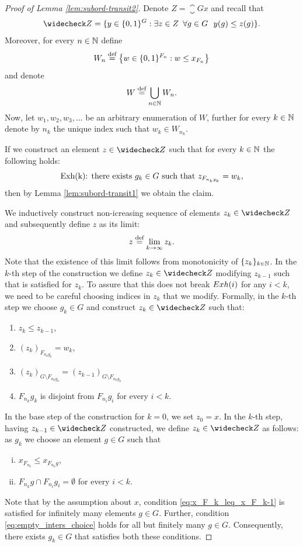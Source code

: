 \begin{proof}[Proof of Lemma \ref{lem:subord-transit2}]
Denote $Z= \closure{Gx}$ and recall that
\[
\subord{Z} = \{y\in\{0,1\}^G:\exists z\in Z \,\,\,\forall g\in G \,\,\,\, y(g)\leq z(g) \}.
\]
Moreover, for every $n\in\mathbb{N}$ define
\[
W_n\stackrel{\textup{def}}{=} \left\{w\in\{0,1\}^{F_n}: w\leq x_{F_n}\right\}
\] 
and denote 
\[
W\stackrel{\textup{def}}{=} \bigcup_{n\in\mathbb{N}} W_n.
\]
Now, let $w_1,w_2,w_3,\ldots$ be an arbitrary enumeration of $W$, further for every $k\in\mathbb{N}$ denote by $n_k$ the unique index such that $w_k\in W_{n_k}$. 

If we construct an element $z\in\subord Z$ such that for every $k\in\mathbb{N}$ the following holds:
\[
\mbox{Exh({k}):  there exists $g_k\in G$ such that $z_{F_{n_kg_k}} = w_k$},
\]
then by Lemma \ref{lem:subord-transit1} we obtain the claim.

We inductively construct non-icreasing sequence of elements $z_k\in\subord{Z}$ and subsequently define $z$ as its limit:
\[
z\stackrel{\textup{def}}{=}\lim_{k\to\infty} z_k. 
\]
Note that the existence of this limit follows from monotonicity of $\{z_k\}_{k\in\mathbb{N}}$.
In the $k$-th step of the construction we define $z_k\in\subord{Z}$ modifying $z_{k-1}$ such that  is satisfied for $z_k$. To assure that this does not break $Exh({i})$ for any $i<k$, we need to be careful choosing indices in $z_k$ that we modify. Formally, in the $k$-th step we choose $g_k\in G$ and construct $z_k\in\subord{Z}$ such that:
\begin{enumerate}[(1)]
\item\label{eq:z_k_leq_z_k-1} $z_{k}\leq z_{k-1}$,
\item\label{eq:z_k_eq_w_k} $(z_k)_{F_{n_kg_k}}=w_k$,
\item\label{eq:z_k_eq_z_k-1} $(z_k)_{G\setminus F_{n_kg_k}}=(z_{k-1})_{G\setminus F_{n_kg_k}}$
\item\label{eq:empty_intersection_Fg} $F_{n_k}g_k$ is disjoint from $F_{n_i}g_i$ for every $i<k$. 
\end{enumerate}


In the base step of the construction for $k=0$, we set $z_0=x$. In the $k$-th step, having $z_{k-1}\in\subord{Z}$ constructed, we define $z_{k}\in\subord{Z}$ as follows: as $g_k$ we choose an element $g\in G$ such that 
\begin{enumerate}[(i)]
\item\label{eq:x_F_k_leq_x_F_k-1} $x_{F_{n_k}}\leq x_{F_{n_k}g}$,
\item\label{eq:empty_inters_choice} $F_{n_k}g\cap F_{n_i}g_i=\emptyset$ for every $i<k$.
\end{enumerate}
Note that by the assumption about $x$, condition \eqref{eq:x_F_k_leq_x_F_k-1} is satisfied for infinitely many elements $g\in G$. Further, condition \eqref{eq:empty_inters_choice}  holds for all but finitely many $g\in G$. Consequently, there exists $g_k\in G$ that satisfies both these conditions.


\end{proof}
